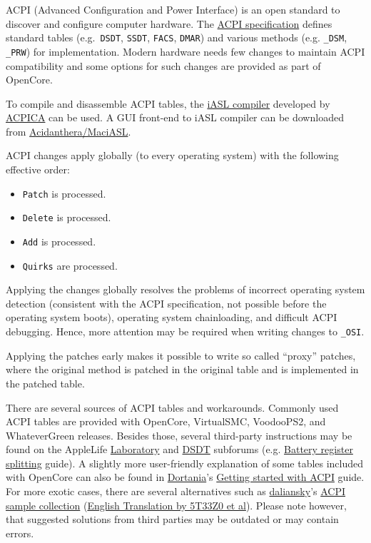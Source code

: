 \documentclass[]{article}
\providecommand{\tightlist}{%
  \setlength{\itemsep}{0pt}\setlength{\parskip}{0pt}}
\begin{document}
ACPI (Advanced Configuration and Power Interface) is an open standard to
discover and configure computer hardware.
The \href{https://uefi.org/specifications}{ACPI specification} defines
standard tables (e.g.~\texttt{DSDT}, \texttt{SSDT}, \texttt{FACS}, \texttt{DMAR})
and various methods (e.g. \texttt{\_DSM}, \texttt{\_PRW}) for implementation.
Modern hardware needs few changes to maintain ACPI compatibility and some
options for such changes are provided as part of OpenCore.

To compile and disassemble ACPI tables, the \href{https://github.com/acpica/acpica}{iASL compiler}
developed by \href{https://www.acpica.org}{ACPICA} can be used. A GUI front-end to iASL compiler
can be downloaded from \href{https://github.com/acidanthera/MaciASL/releases}{Acidanthera/MaciASL}.

ACPI changes apply globally (to every operating system) with the following effective order:

\begin{itemize}
\tightlist
\item \texttt{Patch} is processed.
\item \texttt{Delete} is processed.
\item \texttt{Add} is processed.
\item \texttt{Quirks} are processed.
\end{itemize}

Applying the changes globally resolves the problems of incorrect operating system
detection (consistent with the ACPI specification, not possible before the operating
system boots), operating system chainloading, and difficult ACPI debugging. Hence,
more attention may be required when writing changes to \texttt{\_OSI}.

Applying the patches early makes it possible to write so called ``proxy'' patches,
where the original method is patched in the original table and is implemented in
the patched table.

There are several sources of ACPI tables and workarounds. Commonly used
ACPI tables are provided with OpenCore, VirtualSMC, VoodooPS2, and WhateverGreen
releases. Besides those, several third-party instructions may be found on
the AppleLife \href{https://applelife.ru/forums/xakintosh.67}{Laboratory}
and \href{https://applelife.ru/forums/dsdt.129}{DSDT} subforums
(e.g. \href{https://applelife.ru/posts/498967}{Battery register splitting} guide).
A slightly more user-friendly explanation of some tables included with OpenCore
can also be found in \href{https://dortania.github.io}{Dortania}'s
\href{https://dortania.github.io/Getting-Started-With-ACPI}{Getting started with ACPI} guide.
For more exotic cases, there are several alternatives such as
\href{https://github.com/daliansky}{daliansky}'s
\href{https://github.com/daliansky/OC-little}{ACPI sample collection}
(\href{https://github.com/5T33Z0/OC-Little-Translated}{English Translation by 5T33Z0 et al}).
Please note however, that suggested solutions from third parties may be outdated or may contain errors.
\end{document}
